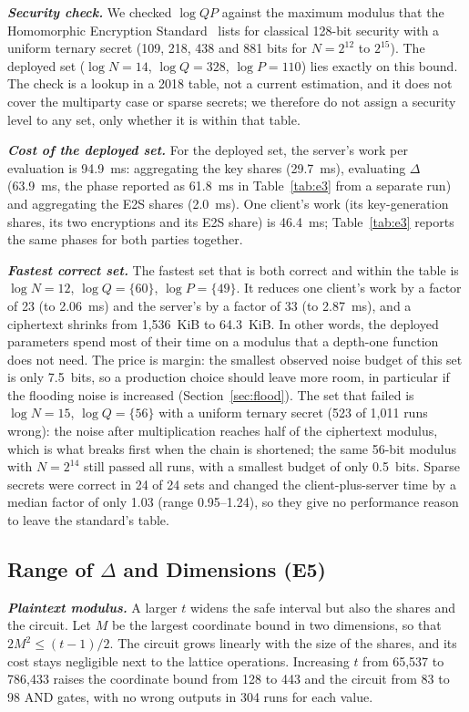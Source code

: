 \documentclass[conference,letterpaper]{IEEEtran}
\begin{document}
\textbf{\textit{Security check.}} We checked $\log QP$ against the maximum modulus that the Homomorphic Encryption Standard~\cite{hestd} lists for classical 128-bit security with a uniform ternary secret (109, 218, 438 and 881 bits for $N = 2^{12}$ to $2^{15}$). The deployed set ($\log N = 14$, $\log Q = 328$, $\log P = 110$) lies exactly on this bound. The check is a lookup in a 2018 table, not a current estimation, and it does not cover the multiparty case or sparse secrets; we therefore do not assign a security level to any set, only whether it is within that table.

\textbf{\textit{Cost of the deployed set.}} For the deployed set, the server's work per evaluation is 94.9~ms: aggregating the key shares (29.7~ms), evaluating $\Delta$ (63.9~ms, the phase reported as 61.8~ms in Table~\ref{tab:e3} from a separate run) and aggregating the E2S shares (2.0~ms). One client's work (its key-generation shares, its two encryptions and its E2S share) is 46.4~ms; Table~\ref{tab:e3} reports the same phases for both parties together.

\textbf{\textit{Fastest correct set.}} The fastest set that is both correct and within the table is $\log N = 12$, $\log Q = \{60\}$, $\log P = \{49\}$. It reduces one client's work by a factor of 23 (to 2.06~ms) and the server's by a factor of 33 (to 2.87~ms), and a ciphertext shrinks from 1,536~KiB to 64.3~KiB. In other words, the deployed parameters spend most of their time on a modulus that a depth-one function does not need. The price is margin: the smallest observed noise budget of this set is only 7.5~bits, so a production choice should leave more room, in particular if the flooding noise is increased (Section~\ref{sec:flood}). The set that failed is $\log N = 15$, $\log Q = \{56\}$ with a uniform ternary secret (523 of 1,011 runs wrong): the noise after multiplication reaches half of the ciphertext modulus, which is what breaks first when the chain is shortened; the same 56-bit modulus with $N = 2^{14}$ still passed all runs, with a smallest budget of only 0.5~bits. Sparse secrets were correct in 24 of 24 sets and changed the client-plus-server time by a median factor of only 1.03 (range 0.95--1.24), so they give no performance reason to leave the standard's table.

\subsection{Range of $\Delta$ and Dimensions (E5)}\label{sec:e5}
\textbf{\textit{Plaintext modulus.}} A larger $t$ widens the safe interval but also the shares and the circuit. Let $M$ be the largest coordinate bound in two dimensions, so that $2M^2 \le (t-1)/2$. The circuit grows linearly with the size of the shares, and its cost stays negligible next to the lattice operations. Increasing $t$ from 65,537 to 786,433 raises the coordinate bound from 128 to 443 and the circuit from 83 to 98 AND gates, with no wrong outputs in 304 runs for each value.
\end{document}
